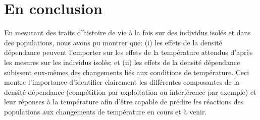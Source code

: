 \section{En conclusion}

En mesurant des traits d'histoire de vie à la fois sur des individus isolés et
dans des populations, nous avons pu montrer que: (i) les effets de la densité
dépendance peuvent l'emporter sur les effets de la température attendus d'après
les mesures sur les individus isolés; et (ii) les effets de la densité
dépendance subissent eux-mêmes des changements liés aux conditions de
température. Ceci montre l'importance d'identifier clairement les différentes
composantes de la densité dépendance (compétition par exploitation ou
interférence par exemple) et leur réponses à la température afin d'être capable
de prédire les réactions des populations aux changements de température en cours
et à venir. 
